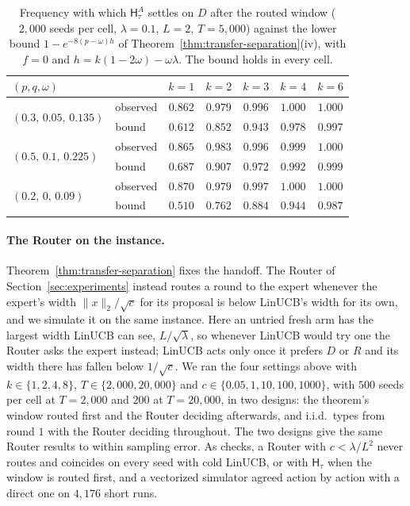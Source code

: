 \documentclass[anon]{alt2027} %
\newcommand{\Hyb}{\mathsf{H}}
\begin{document}
\begin{table}[h]
\centering
\caption{Frequency with which $\Hyb^A_\tau$ settles on $D$ after the routed
window ($2{,}000$ seeds per cell, $\lambda=0.1$, $L=2$, $T=5{,}000$) against the
lower bound $1-e^{-8(p-\omega)h}$ of Theorem~\ref{thm:transfer-separation}(iv),
with $f=0$ and $h=k(1-2\omega)-\omega\lambda$. The bound holds in every cell.}
\label{tab:transfer-check}
\small
\begin{tabular}{@{}llccccc@{}}
\toprule
$(p,q,\omega)$ & & $k=1$ & $k=2$ & $k=3$ & $k=4$ & $k=6$ \\
\midrule
\multirow{2}{*}{$(0.3,\,0.05,\,0.135)$} & observed & $0.862$ & $0.979$ & $0.996$ & $1.000$ & $1.000$ \\
 & bound & $0.612$ & $0.852$ & $0.943$ & $0.978$ & $0.997$ \\
\midrule
\multirow{2}{*}{$(0.5,\,0.1,\,0.225)$} & observed & $0.865$ & $0.983$ & $0.996$ & $0.999$ & $1.000$ \\
 & bound & $0.687$ & $0.907$ & $0.972$ & $0.992$ & $0.999$ \\
\midrule
\multirow{2}{*}{$(0.2,\,0,\,0.09)$} & observed & $0.870$ & $0.979$ & $0.997$ & $1.000$ & $1.000$ \\
 & bound & $0.510$ & $0.762$ & $0.884$ & $0.944$ & $0.987$ \\
\bottomrule
\end{tabular}
\end{table}

\paragraph{The Router on the instance.}
\label{app:router-sim}
Theorem~\ref{thm:transfer-separation} fixes the handoff. The Router of
Section~\ref{sec:experiments} instead routes a round to the expert whenever
the expert's width $\|x\|_2/\sqrt c$ for its proposal is below LinUCB's width
for its own, and we simulate it on the same instance. Here an untried fresh arm
has the largest width LinUCB can see, $L/\sqrt\lambda$, so whenever LinUCB would
try one the Router asks the expert instead; LinUCB acts only once it prefers
$D$ or $R$ and its width there has fallen below $1/\sqrt c$. We ran the four
settings above with $k\in\{1,2,4,8\}$, $T\in\{2{,}000,20{,}000\}$ and
$c\in\{0.05,1,10,100,1000\}$, with $500$ seeds per cell at $T=2{,}000$ and $200$
at $T=20{,}000$, in two designs: the theorem's window routed first and the
Router deciding afterwards, and i.i.d.\ types from round $1$ with the Router
deciding throughout. The two designs give the same Router results to within
sampling error. As checks, a Router with $c<\lambda/L^2$ never routes and
coincides on every seed with cold LinUCB, or with $\Hyb_\tau$ when the window
is routed first, and a vectorized simulator agreed action by action with a
direct one on $4{,}176$ short runs.
\end{document}
